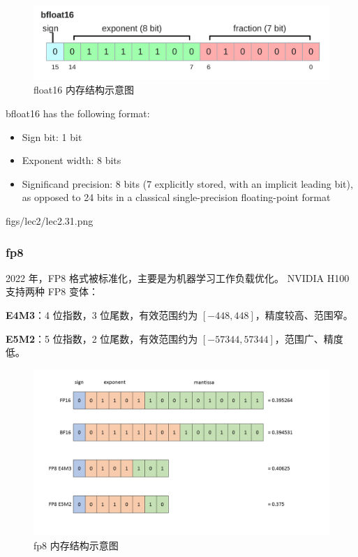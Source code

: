 \begin{figure}[htbp]
  \centering
  \includegraphics[width=0.9\linewidth]{figs/lec2/lec2.30.png}
  \caption{float16 内存结构示意图}
  \label{fig:float16 内存结构示意图}
\end{figure}

bfloat16 has the following format:
\begin{itemize}
  \item Sign bit: 1 bit
  \item Exponent width: 8 bits
  \item Significand precision: 8 bits (7 explicitly stored, with an implicit leading bit), as opposed to 24 bits in a classical single-precision floating-point format
\end{itemize}

\MarginImageWithNote
  {figs/lec2/lec2.31.png}
  {}


\clearpage
\subsubsection{fp8}
2022 年，FP8 格式被标准化，主要是为机器学习工作负载优化。
NVIDIA H100 支持两种 FP8 变体：

\textbf{E4M3}：4 位指数，3 位尾数，有效范围约为 $[-448, 448]$，精度较高、范围窄。

\textbf{E5M2}：5 位指数，2 位尾数，有效范围约为 $[-57344, 57344]$，范围广、精度低。

\begin{figure}[htbp]
  \centering
  \includegraphics[width=0.9\linewidth]{figs/lec2/lec2.32.png}
  \caption{fp8 内存结构示意图}
  \label{fig:fp8 内存结构示意图}
\end{figure}

